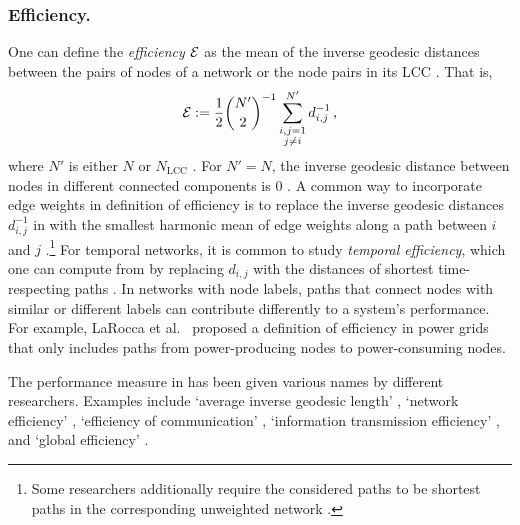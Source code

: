 \documentclass{comnet-mod}
\begin{document}
\subsubsection{Efficiency.}\label{sec:efficiency}

One can define the \textit{efficiency} $\mathcal{E}$ as the mean of the inverse geodesic distances between the pairs of nodes of a network \cite{Beygelzimer2005} or the node pairs in its LCC \cite{Goni2013}. That is,
\begin{align}
	\mathcal{E} := \frac{1}{2}\binom{N'}{2}^{-1}\sum_{\substack{i,j=1\\j\neq i}}^{N'} d_{i,j}^{-1}\,,\label{eq:effi}
\end{align}
where $N'$ is either $N$ \cite{Beygelzimer2005} or $N_{\textrm{LCC}}$ \cite{Goni2013}. For $N' = N$, the inverse geodesic distance between nodes in different connected components is 0 \cite{Beygelzimer2005}. A common way to incorporate edge weights in definition of efficiency is to replace the inverse geodesic distances $d_{i,j}^{-1}$ in  with the smallest harmonic mean of edge weights along a path between $i$ and $j$ \cite{Latora2001, Bellingeri2018}.\footnote{Some researchers additionally require the considered paths to be shortest paths in the corresponding unweighted network \cite{Zhang2013b, Zhou2019a, Zhang2021, Qian2022}.}
For temporal networks, it is common to study \textit{temporal efficiency}, which one can compute from  by replacing $d_{i,j}$ with the distances of shortest time-respecting paths \cite{Scellato2011}. In networks with node labels, paths that connect nodes with similar or different labels can contribute differently to a system's performance.
 For example, LaRocca et al.~\cite{LaRocca2015}
proposed a definition of efficiency in power grids that only includes paths from power-producing nodes to power-consuming nodes.

The performance measure in  has been given various names by different researchers. Examples include `average inverse geodesic length' \cite{Holme2002, Hossain2013, Wang2014a, Nie2015}, `network efficiency' \cite{Feyessa2011, LaRocca2015, Zhou2021, Li2023b}, `efficiency of communication' \cite{Beygelzimer2005}, `information transmission efficiency' \cite{Gao2017},  and `global efficiency' \cite{Lordan2014}.
\end{document}
